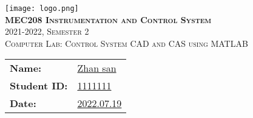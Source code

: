 \documentclass[main.tex]{subfiles}
\begin{document}
\begin{titlepage}
	\centering
    \vspace*{1cm}

    \texttt{[image: logo.png]}\\[2.0 cm]

    \textsc{\Large \bfseries MEC208 Instrumentation and Control System}\\[0.5 cm]
    \textsc{\Large 2021-2022, Semester 2}\\[2 cm]

	\textsc{\large Computer Lab: Control System CAD and CAS using MATLAB}\\[5 cm]

        \begin{table}[htbp]
            \centering
            \large
            \begin{tabular}{ll}
                \textbf{Name:}       & \underline{Zhan san}   \\
                \textbf{Student ID:} & \underline{1111111}    \\
                \textbf{Date:}       & \underline{2022.07.19}
            \end{tabular}
        \end{table}

\end{titlepage}
\end{document}
